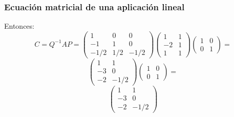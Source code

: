 \documentclass{beamer}
\begin{document}
 
 
 
\begin{frame}
\frametitle{Ecuaci\'on matricial de una aplicaci\'on lineal}
Entonces:
\[ C = Q^{-1} A P = \left(\begin{array}{rrr}1 & 0& 0 \\-1 & 1 & 0 \\-1/2 & 1/2 & -1/2\end{array}\right) \left(\begin{array}{rr}1 & 1 \\-2 & 1 \\1 & 1\end{array}\right)  \left(\begin{array}{rr}1 & 0 \\0 & 1 \end{array}\right) = \]
\[ \left(\begin{array}{rr}1 & 1 \\-3 & 0 \\-2 & -1/2\end{array}\right)  \left(\begin{array}{rr}1 & 0 \\0 & 1 \end{array}\right) = \]
\[ \left(\begin{array}{rr}1 & 1 \\-3 & 0 \\-2 & -1/2\end{array}\right)\]

 \end{frame}    
 
 
 
\end{document}
